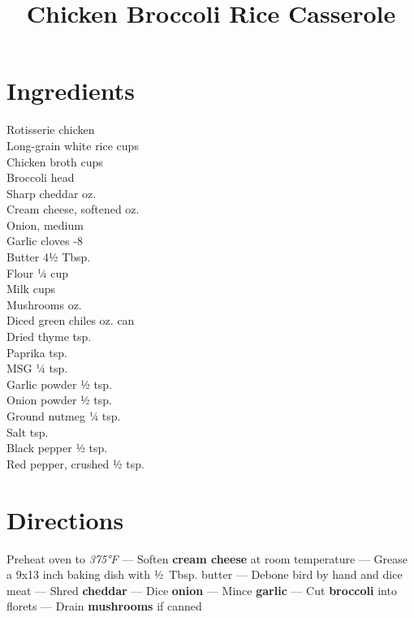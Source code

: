 \documentclass[11pt,letterpaper]{article}
\title{Chicken Broccoli Rice Casserole}
\author{}
\date{}
\begin{document}
\maketitle
\thispagestyle{empty}

\section*{Ingredients}
\setlength{\columnsep}{20pt}
\begin{multicols}{2}
\noindent
    Rotisserie chicken  \\
    Long-grain white rice  cups \\
    Chicken broth  cups \\
    Broccoli  head \\
    Sharp cheddar  oz. \\
    Cream cheese, softened  oz. \\
    Onion, medium  \\
    Garlic cloves -8 \\
    Butter \dotfill 4½ Tbsp. \\
    Flour \dotfill ¼ cup \\
    Milk  cups \\
    \columnbreak
    Mushrooms  oz. \\
    Diced green chiles  oz. can \\
    Dried thyme  tsp. \\
    Paprika  tsp. \\
    MSG \dotfill ¼ tsp. \\
    Garlic powder \dotfill ½ tsp. \\
    Onion powder \dotfill ½ tsp. \\
    Ground nutmeg \dotfill ¼ tsp. \\
    Salt  tsp. \\
    Black pepper \dotfill ½ tsp. \\
    Red pepper, crushed \dotfill ½ tsp.
\end{multicols}

\section*{Directions}

\noindent
Preheat oven to \textit{375°F} ---
Soften \textbf{cream cheese} at room temperature ---
Grease a 9x13 inch baking dish with ½~Tbsp. butter ---
Debone bird by hand and dice meat ---
Shred \textbf{cheddar} ---
Dice \textbf{onion} ---
Mince \textbf{garlic} ---
Cut \textbf{broccoli} into florets ---
Drain \textbf{mushrooms} if canned
\end{document}
